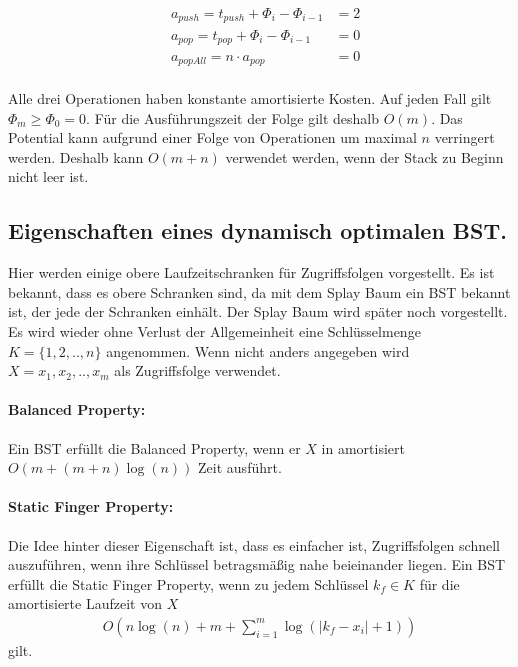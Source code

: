 \documentclass[a4paper,12pt]{article}
\begin{document}
\begin{align*}   
&a_{\mathit{push}} = t_{\mathit{push}} + \Phi_{i} - \Phi_{i-1}  &= 2\\
&a_{\mathit{pop}} = t_{\mathit{pop}} + \Phi_{i} - \Phi_{i-1}  &= 0\\
&a_{\mathit{popAll}} = n \cdot a_{\mathit{pop}} &= 0
\end{align*}\\
Alle drei Operationen haben konstante amortisierte Kosten. Auf jeden Fall gilt $ \Phi_m \geq  \Phi_0 = 0 $. Für die Ausführungszeit der Folge gilt deshalb $O(m)$. Das Potential kann aufgrund einer Folge von Operationen um maximal $n$ verringert werden. Deshalb kann $O\left(m + n\right)$ verwendet werden, wenn der Stack zu Beginn nicht leer ist.  \\



\subsection{Eigenschaften eines dynamisch optimalen BST. }\label{upperBounds}
Hier werden einige obere Laufzeitschranken für Zugriffsfolgen vorgestellt. Es ist bekannt, dass es obere Schranken sind, da mit dem Splay Baum ein BST bekannt ist, der jede der Schranken einhält. Der Splay Baum wird später noch vorgestellt. Es wird wieder ohne Verlust der Allgemeinheit eine Schlüsselmenge $K = \{1,2,..,n\}$ angenommen. Wenn nicht anders angegeben wird  $X = x_1,x_2,..,x_m$ als Zugriffsfolge verwendet. 


\paragraph{Balanced Property:}
Ein BST erfüllt die Balanced Property, wenn er $X$ in amortisiert $O\left(m + \left(m + n\right) \log \left( n\right)  \right)$ Zeit ausführt. 

\paragraph{Static Finger Property:}
Die Idee hinter dieser Eigenschaft ist, dass es einfacher ist, Zugriffsfolgen schnell auszuführen, wenn ihre Schlüssel betragsmäßig nahe beieinander liegen. Ein BST erfüllt die Static Finger Property, wenn zu jedem Schlüssel $k_f \in K$ für die amortisierte Laufzeit von $X$ 
\begin{align*}
O\left( n \log\left( n\right) +m + \sum_{i = 1}^{m} \log \left( \vert k_f - x_i  \vert	+ 1	\right)\right)
\end{align*}
gilt. 
\end{document}
